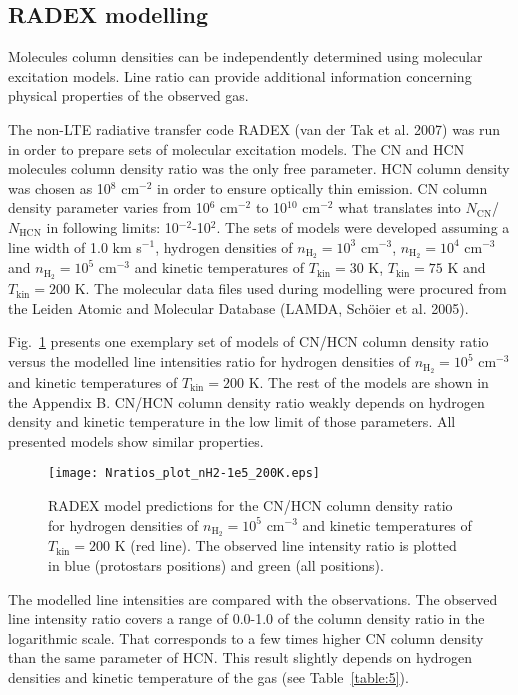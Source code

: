 \documentclass{aa}
\begin{document}
\subsection{RADEX modelling}

Molecules column densities can be independently determined using molecular excitation models. Line ratio can provide additional information concerning physical properties of the observed gas. 

The non-LTE radiative transfer code RADEX (van der Tak et al. 2007) was run in order to prepare sets of molecular excitation models. The CN and HCN molecules column density ratio was the only free parameter. HCN column density was chosen as 10$^8$ cm$^{-2}$ in order to ensure optically thin emission. CN column density parameter varies from 10$^6$ cm$^{-2}$ to 10$^{10}$ cm$^{-2}$ what translates into $N_\mathrm{CN}$/$N_\mathrm{HCN}$ in following limits: 10$^{-2}$-10$^{2}$. The sets of models were developed assuming a line width of 1.0 km s$^{-1}$, hydrogen densities of $n_\mathrm{H_2} = 10^3$ cm$^{-3}$, $n_\mathrm{H_2} = 10^4$ cm$^{-3}$ and $n_\mathrm{H_2} = 10^5$ cm$^{-3}$ and kinetic temperatures of $T_\mathrm{kin} = 30$ K, $T_\mathrm{kin} = 75$ K and $T_\mathrm{kin} =200$ K. The molecular data files used during modelling were procured from the Leiden Atomic and Molecular Database (LAMDA, Schöier et al. 2005).

Fig.~\ref{1e5_75K} presents one exemplary set of models of CN/HCN column density ratio versus the modelled line intensities ratio for hydrogen densities of $n_\mathrm{H_2} = 10^5$ cm$^{-3}$ and kinetic temperatures of $T_\mathrm{kin} = 200$ K. The rest of the models are shown in the Appendix B. CN/HCN column density ratio weakly depends on hydrogen density and kinetic temperature in the low limit of those parameters. All presented models show similar properties.

\begin{figure}
   \centering
   \texttt{[image: Nratios\_plot\_nH2-1e5\_200K.eps]}
      \caption{RADEX model predictions for the CN/HCN column density ratio for hydrogen densities of $n_\mathrm{H_2} = 10^5$ cm$^{-3}$ and kinetic temperatures of $T_\mathrm{kin} = 200$ K (red line). The observed line intensity ratio is plotted in blue (protostars positions) and green (all positions).}
         \label{1e5_75K}
   \end{figure}

The modelled line intensities are compared with the observations. The observed line intensity ratio covers a range of \mbox{0.0-1.0} of the column density ratio in the logarithmic scale. That corresponds to a few times higher CN column density than the same parameter of HCN. This result slightly depends on hydrogen densities and kinetic temperature of the gas (see Table~\ref{table:5}).
\end{document}
